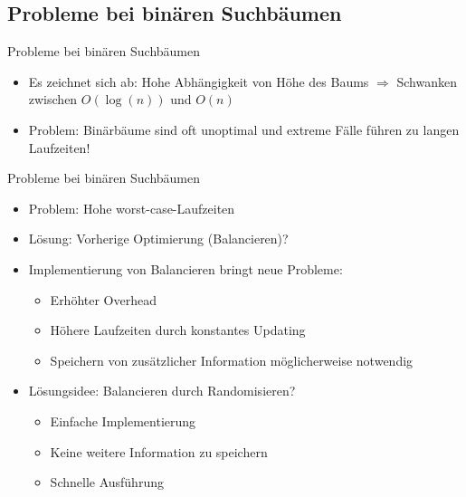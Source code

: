 \documentclass[t]{beamer}
\theoremstyle{plain}
\begin{document}
\subsection{Probleme bei binären Suchbäumen}
    \begin{frame}{Probleme bei binären Suchbäumen}
    \begin{itemize}
    \item Es zeichnet sich ab: Hohe Abhängigkeit von Höhe des Baums $\Rightarrow$ Schwanken zwischen $O(\log(n))$ und $O(n)$
    \item Problem: Binärbäume sind oft unoptimal und extreme Fälle führen zu langen Laufzeiten!
    \end{itemize}
    {}
\end{frame}

\begin{frame}{Probleme bei binären Suchbäumen}
    \begin{itemize}
    \item Problem: Hohe worst-case-Laufzeiten
    \item Lösung: Vorherige Optimierung (Balancieren)?
    \item Implementierung von Balancieren bringt neue Probleme:
        \begin{itemize}
        \item Erhöhter Overhead
        \item Höhere Laufzeiten durch konstantes Updating
        \item Speichern von zusätzlicher Information möglicherweise notwendig
        \end{itemize}
    \bigskip
    \item Lösungsidee: Balancieren durch Randomisieren?
    \begin{itemize}
        \item Einfache Implementierung
        \item Keine weitere Information zu speichern
        \item Schnelle Ausführung
    \end{itemize}
\end{itemize}
\end{frame}
\end{document}
